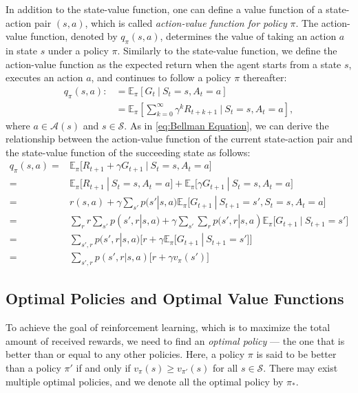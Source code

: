 In addition to the state-value function, one can define a value function of a state-action pair $(s,a)$, which is called \textit{action-value function for policy} $\pi$. The action-value function, denoted by $q_\pi(s,a)$, determines the value of taking an action $a$ in state $s$ under a policy $\pi$. Similarly to the state-value function, we define the action-value function as the expected return when the agent starts from a state $s$, executes an action $a$, and continues to follow a policy $\pi$ thereafter:
\begin{align}
    q_\pi(s,a) :&= \mathbb{E}_\pi[G_t \ | \ S_t=s, A_t=a] \nonumber\\
    &= \mathbb{E}_\pi\left[\sum_{k=0}^{\infty}\gamma^kR_{t+k+1} \ | \ S_t=s, A_t=a\right],
\end{align}
where $a\in \mathcal{A}(s)$ and $s\in\mathcal{S}$. As in \eqref{eq:Bellman Equation}, we can derive the relationship between the action-value function of the current state-action pair and the state-value function of the succeeding state as follows: 
\begin{align}
    q_\pi (s,a) =& \mathbb{E}_\pi \big[ R_{t+1} + \gamma G_{t+1} \ | \ S_t = s, A_t = a \big] \nonumber \\
    =& \mathbb{E}_\pi \big[ R_{t+1} \ | \ S_t = s, A_t = a \big] + \mathbb{E}_\pi \big[ \gamma G_{t+1} \ | \ S_t = s, A_t = a \big] \nonumber \\
    =& r(s,a) + \gamma \sum_{s'}p(s'|s,a)\mathbb{E}_\pi \big[ G_{t+1} \ | \ S_{t+1}=s', S_t=s, A_t = a \big]\nonumber\\
    =& \sum_r r \sum_{s'}p(s',r|s,a) + \gamma \sum_{s'}\sum_{r}p(s',r|s,a)\mathbb{E}_\pi\big[G_{t+1} \ | \ S_{t+1}=s' \big]\nonumber\\
    =& \sum_{s',r}p(s',r|s,a)\Big[ r + \gamma \mathbb{E}_\pi \big[G_{t+1} \ | \ S_{t+1}=s'\big]\Big]\nonumber\\
    =& \sum_{s',r}p(s',r|s,a)\big[ r + \gamma v_\pi(s')\big] \label{eq:reculsive-action-value}
\end{align}

\subsection{Optimal Policies and Optimal Value Functions}
To achieve the goal of reinforcement learning, which is to maximize the total amount of received rewards, we need to find an \textit{optimal policy} --- the one that is better than or equal to any other policies. Here, a policy $\pi$ is said to be better than a policy $\pi'$ if and only if $v_\pi(s) \geq v_{\pi'}(s)$ for all $s\in\mathcal{S}$. There may exist multiple optimal policies, and we denote all the optimal policy by $\pi_\ast$.

